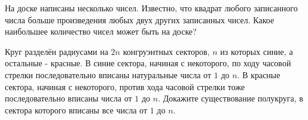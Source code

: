 \documentclass[12pt]{article}
\begin{document}
\begin{task}
На доске написаны несколько чисел. Известно, что квадрат любого записанного числа больше произведения любых двух других записанных чисел. Какое наибольшее количество чисел может быть на доске?
\end{task}

\begin{task}
Круг разделён радиусами на $2n$ конгруэнтных секторов, $n$ из которых синие, а остальные - красные. В синие сектора, начиная с некоторого, по ходу часовой стрелки последовательно вписаны натуральные числа от $1$ до $n$. В красные сектора, начиная с некоторого, против хода часовой стрелки тоже последовательно вписаны числа от $1$ до $n$. Докажите существование полукруга, в сектора которого вписаны все числа от $1$ до $n$.
\end{task}

\begin{solution}

\end{solution}
\end{document}

